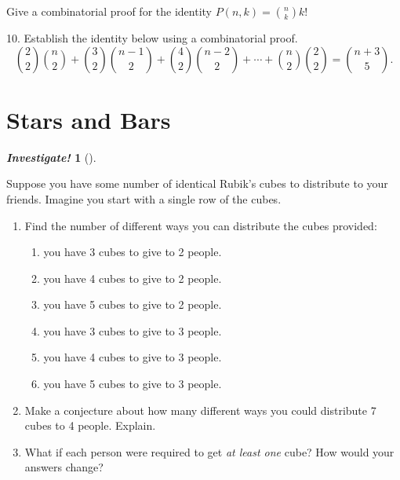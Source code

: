 \documentclass[10pt,]{book}
\theoremstyle{plain}
\theoremstyle{definition}
\theoremstyle{definition}
\newtheorem{investigation}[project]{\emph{Investigate!}}
\theoremstyle{definition}
\numberwithin{equation}{section}
\begin{document}
\begin{exerciselist}
          Give a combinatorial proof for the identity \(P(n,k) = {n \choose k}k!\)
\par\smallskip
\item[10.]\hypertarget{exercise-81}{}
          Establish the identity below using a combinatorial proof.
          \begin{equation*}
            {2 \choose 2}{n \choose 2} + {3 \choose 2}{n-1 \choose 2} + {4\choose 2}{n-2 \choose 2} + \cdots + {n\choose 2}{2\choose 2} = {n+3 \choose 5}.
          \end{equation*}
\par\smallskip
\end{exerciselist}
\typeout{************************************************}
\typeout{************************************************}
\section[Stars and Bars]{Stars and Bars}\label{sec_stars-and-bars}

%
\begin{investigation}[]\label{investigation-10}

  Suppose you have some number of identical Rubik's cubes to distribute to your friends. Imagine you start with a single row of the cubes.


\leavevmode%
\begin{enumerate}
\item\hypertarget{li-556}{}
 Find the number of different ways you can distribute the cubes provided:
%
\begin{enumerate}
\item\hypertarget{li-557}{}
you have 3 cubes to give to 2 people.
%
\item\hypertarget{li-558}{}
you have 4 cubes to give to 2 people.
%
\item\hypertarget{li-559}{}
you have 5 cubes to give to 2 people.
%
\item\hypertarget{li-560}{}
you have 3 cubes to give to 3 people.
%
\item\hypertarget{li-561}{}
you have 4 cubes to give to 3 people.
%
\item\hypertarget{li-562}{}
you have 5 cubes to give to 3 people.
%
\end{enumerate}
\item\hypertarget{li-563}{}
Make a conjecture about how many different ways you could distribute 7 cubes to 4 people. Explain.
%
\item\hypertarget{li-564}{}
What if each person were required to get \emph{at least one} cube? How would your answers change?
%
\end{enumerate}

%
\end{investigation}
\par
\end{document}
